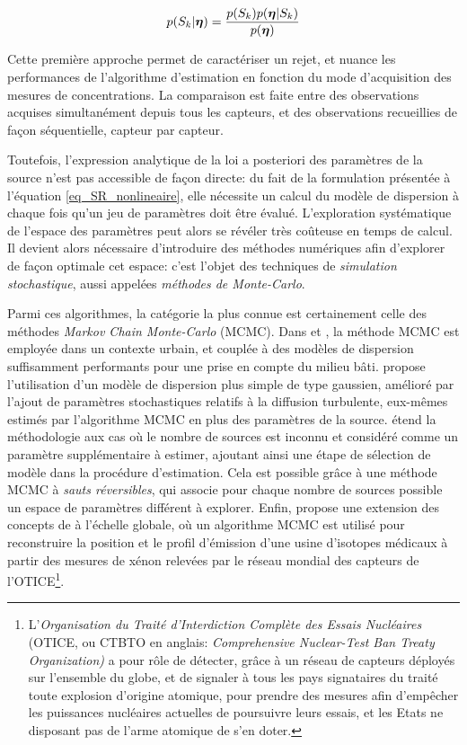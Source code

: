  \begin{equation}
 \label{eq_bayes_monte_carlo}
 p(S_k|{\bm{\eta}}) = \dfrac{p(S_k)p({\bm{\eta}} | S_k)}{p({\bm{\eta}})}
 \end{equation}
 
 Cette première approche permet de caractériser un rejet, {et nuance les performances de l'algorithme d'estimation en fonction du mode d'acquisition des mesures de concentrations. La comparaison est faite entre des observations acquises simultanément depuis tous les capteurs, et des observations recueillies de façon séquentielle, capteur par capteur.}
 
 Toutefois, l'expression analytique de la  loi a posteriori des paramètres de la source n'est  pas accessible de façon directe: du fait de la formulation présentée à l'équation \eqref{eq_SR_nonlineaire}, elle nécessite un calcul du modèle de dispersion à chaque fois qu'un jeu de paramètres doit être évalué. L'exploration systématique de l'espace des paramètres peut alors se révéler très coûteuse en temps de calcul. Il devient alors nécessaire d'introduire des méthodes numériques afin d'explorer de façon optimale cet espace: c'est l'objet des techniques de \textit{simulation stochastique}, aussi appelées \textit{méthodes de Monte-Carlo}.

 Parmi ces algorithmes, la catégorie la plus connue est certainement celle des méthodes  \textit{Markov Chain Monte-Carlo} (MCMC). Dans \cite{Keats2007} et \cite{Chow2008}, la méthode MCMC est employée dans un contexte urbain, et couplée à des modèles de dispersion suffisamment performants pour une prise en compte du milieu bâti. \cite{Senocak2008} propose l'utilisation d'un modèle de dispersion plus simple de type gaussien, amélioré par l'ajout de paramètres stochastiques relatifs à la diffusion turbulente, eux-mêmes estimés par l'algorithme MCMC en plus des paramètres de la source. \cite{Yee2008b} étend la méthodologie aux cas où le nombre de sources est inconnu et considéré comme un paramètre supplémentaire à estimer, ajoutant ainsi une étape de sélection de modèle dans la procédure d'estimation. Cela est possible grâce à une méthode MCMC à \textit{sauts réversibles}, qui associe pour chaque nombre de sources possible un espace de paramètres différent à explorer. Enfin, \cite{Yee2014} propose une extension des concepts de \cite{Keats2007} à l'échelle globale, où un algorithme MCMC est utilisé pour reconstruire la position et le profil d'émission d'une usine d'isotopes médicaux à partir des mesures de xénon relevées par le réseau mondial des capteurs de l'OTICE\footnote{L'\textit{Organisation du Traité d'Interdiction Complète des Essais Nucléaires} (OTICE, ou CTBTO en anglais: \textit{Comprehensive Nuclear-Test Ban Treaty Organization)} a pour rôle de détecter, grâce à un réseau de capteurs déployés sur l'ensemble du globe, et de signaler à tous les pays signataires du traité toute explosion d'origine atomique, pour prendre des mesures afin d'empêcher les puissances nucléaires actuelles de poursuivre leurs essais, et les Etats ne disposant pas de l'arme atomique de s'en doter.}. \\